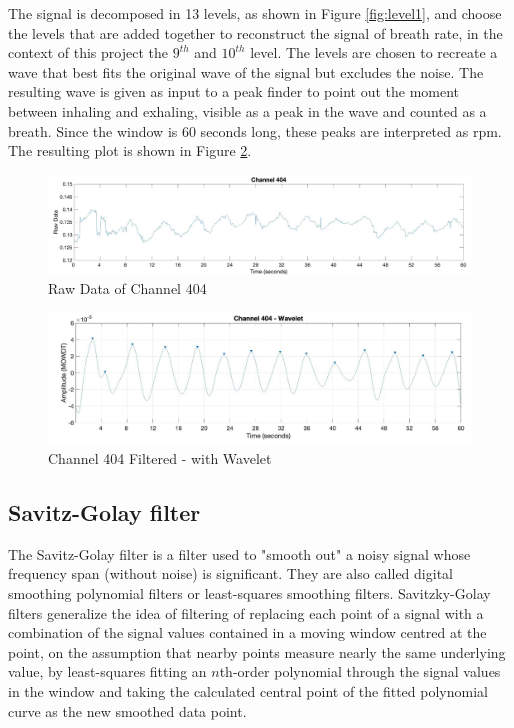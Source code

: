 The signal is decomposed in 13 levels, as shown in Figure \ref{fig:level1}, and choose the levels that are added together to reconstruct the signal of breath rate, in the context of this project the $9^{th}$ and $10^{th}$ level. The levels are chosen to recreate a wave that best fits the original wave of the signal but excludes the noise.
The resulting wave is given as input to a peak finder to point out the moment between inhaling and exhaling, visible as a peak in the wave and counted as a breath. Since the window is 60 seconds long, these peaks are interpreted as rpm. The resulting plot is shown in Figure \ref{fig:404Filt}.
\begin{figure}[H]
    \centering
    \includegraphics[width=\textwidth]{img/404.jpg}
    \caption{Raw Data of Channel 404}
    \label{fig:404}
\end{figure}

\begin{figure}[H]
    \centering
    \includegraphics[width=\textwidth]{img/404_wave.jpg}
    \caption{Channel 404 Filtered - with Wavelet}
    \label{fig:404Filt}
\end{figure}


\subsection{Savitz-Golay filter} \label{sg}


The Savitz-Golay filter is a filter used to "smooth out" a noisy signal whose frequency span (without noise) is significant. 
They are also called digital smoothing polynomial filters or least-squares smoothing filters. 
Savitzky-Golay filters generalize the idea of filtering of replacing each point of a signal with a combination of the signal values contained in a moving window centred at the point, on the assumption that nearby points measure nearly the same underlying value, by least-squares fitting an $n$th-order polynomial through the signal values in the window and taking the calculated central point of the fitted polynomial curve as the new smoothed data point.

